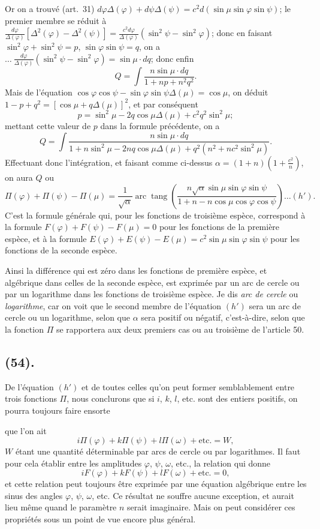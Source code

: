 \documentclass{article}
\begin{document}
Or on a trouvé (art.\ 31) $d\varphi\Delta(\varphi)+d\psi\Delta(\psi)=c^{2}d(\sin\mu\sin\varphi\sin\psi)$; le premier membre se réduit à $\frac{d\varphi}{\Delta(\varphi)}[\Delta^{2}(\varphi)-\Delta^{2}(\psi)]=\frac{c^{2}d\varphi}{\Delta(\varphi)}(\sin^{2}\psi-\sin^{2}\varphi)$; donc en faisant $\sin^{2}\varphi+\sin^{2}\psi=p$, $\sin\varphi\sin\psi=q$, on a~$\ldots\ \frac{d\varphi}{\Delta(\varphi)}(\sin^{2}\psi-\sin^{2}\varphi)=\sin\mu\cdot dq$; donc enfin
\[ Q=\int\frac{n\sin\mu\cdot dq}{1+np+n^{2}q^{2}}. \]
Mais de l'équation $\cos\varphi\cos\psi-\sin\varphi\sin\psi\Delta(\mu)=\cos\mu$, on déduit $1-p+q^{2}=[\cos\mu+q\Delta(\mu)]^{2}$, et par conséquent
\[ p=\sin^{2}\mu-2q\cos\mu\Delta(\mu)+c^{2}q^{2}\sin^{2}\mu; \]
mettant cette valeur de $p$ dans la formule précédente, on a
\[ Q=\int\frac{n\sin\mu\cdot dq}{1+n\sin^{2}\mu-2nq\cos\mu\Delta(\mu)+q^{2}(n^{2}+nc^{2}\sin^{2}\mu)}. \]
Effectuant donc l'intégration, et faisant comme ci-dessus $\alpha=(1+n)\left(1+\frac{c^{2}}{n}\right)$, on aura $Q$ ou
\[ \Pi(\varphi)+\Pi(\psi)-\Pi(\mu)=\frac{1}{\sqrt{\alpha}}\operatorname{arc}\operatorname{tang}\left(\frac{n\sqrt{\alpha}\sin\mu\sin\varphi\sin\psi}{1+n-n\cos\mu\cos\varphi\cos\psi}\right)\ldots(h'). \]
C'est la formule générale qui, pour les fonctions de troisième espèce, correspond à la formule $F(\varphi)+F(\psi)-F(\mu)=0$ pour les fonctions de la première espèce, et à la formule $E(\varphi)+E(\psi)-E(\mu)=c^{2}\sin\mu\sin\varphi\sin\psi$ pour les fonctions de la seconde espèce.

Ainsi la différence qui est zéro dans les fonctions de première espèce, et algébrique dans celles de la seconde espèce, est exprimée par un arc de cercle ou par un logarithme dans les fonctions de troisième espèce. Je dis \emph{arc de cercle} ou \emph{logarithme}, car on voit que le second membre de l'équation $(h')$ sera un arc de cercle ou un logarithme, selon que $\alpha$ sera positif ou négatif, c'est-à-dire, selon que la fonction $\Pi$ se rapportera aux deux premiers cas ou au troisième de l'article 50.

\subsection*{(54).}

De l'équation $(h')$ et de toutes celles qu'on peut former semblablement entre trois fonctions $\Pi$, nous conclurons que si $i$, $k$, $l$, etc. sont des entiers positifs, on pourra toujours faire ensorte

que l'on ait
\[ i\Pi(\varphi)+k\Pi(\psi)+l\Pi(\omega)+\text{etc.}=W, \]
$W$ étant une quantité déterminable par arcs de cercle ou par logarithmes. Il faut pour cela établir entre les amplitudes $\varphi$, $\psi$, $\omega$, etc., la relation qui donne
\[ iF(\varphi)+kF(\psi)+lF(\omega)+\text{etc.}=0, \]
et cette relation peut toujours être exprimée par une équation algébrique entre les sinus des angles $\varphi$, $\psi$, $\omega$, etc. Ce résultat ne souffre aucune exception, et aurait lieu même quand le paramètre $n$ serait imaginaire. Mais on peut considérer ces propriétés sous un point de vue encore plus général.
\end{document}
